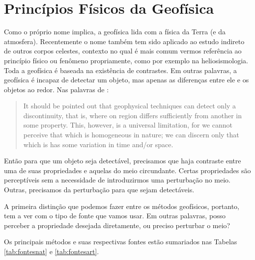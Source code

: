 \documentclass[a4paper,11pt]{scrbook}
\begin{document}
\section{Princ\'ipios F\'{i}sicos da Geof\'{i}sica} 
	Como o pr\'{o}prio nome implica, a geof\'{i}sica lida com a f\'{i}sica da Terra (e da atmosfera).
	Recentemente o nome tamb\'{e}m tem sido aplicado ao estudo indireto de outros corpos celestes, contexto no qual \'{e} mais comum vermos refer\^{e}ncia ao princ\'{i}pio f\'{i}sico ou fen\^{o}meno propriamente, como por exemplo na heliosismologia.
	Toda a geof\'{i}sica \'{e} baseada na exist\^{e}ncia de contrastes.
	Em outras palavras, a geof\'{i}sica \'{e} incapaz de detectar um objeto, mas apenas as diferen\c{c}as entre ele e os objetos ao redor.
	Nas palavras de \citeauthor{telford_applied_1990}:
	\begin{quote}
	It should be pointed out that geophysical techniques can detect only a discontinuity, that is, where on region differs sufficiently from another in some property.
	This, however, is a universal limitation, for we cannot perceive that which is homogeneous in nature; we can discern only that which is has some variation in time and/or space.
	\end{quote}
	
	Ent\~{a}o para que um objeto seja detect\'{a}vel, precisamos que haja contraste entre uma de suas propriedades e aquelas do meio circundante.
	Certas propriedades s\~{a}o percept\'{i}veis sem a necessidade de introduzirmos uma perturba\c{c}\~{a}o no meio.
	Outras, precisamos da perturba\c{c}\~{a}o para que sejam detect\'{a}veis.

	A primeira distin\c{c}\~{a}o que podemos fazer entre os m\'{e}todos geof\'{i}sicos, portanto, tem a ver com o tipo de fonte que vamos usar.
	Em outras palavras, posso perceber a propriedade desejada diretamente, ou preciso perturbar o meio?

	Os principais m\'{e}todos e suas respectivas fontes est\~{a}o sumariados nas Tabelas \ref{tab:fontesnat} e \ref{tab:fontesart}.
\end{document}
